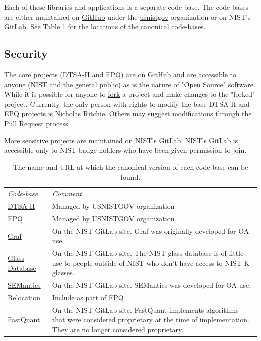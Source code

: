 \documentclass{article}
\begin{document}
Each of these libraries and applications is a separate code-base.  The code bases are either maintained on \href{https://github.com/}{GitHub} under the \href{https://github.com/usnistgov}{usnistgov} organization or on NIST's \href{https://gitlab.nist.gov}{GitLab}.  See Table \ref{tab:code_urls} for the locations of the canonical code-bases.

\subsection{Security}
The core projects (DTSA-II and EPQ) are on GitHub and are accessible to anyone (NIST and the general public) as is the nature of "Open Source" software.  While it is possible for anyone to \href{https://docs.github.com/en/pull-requests/collaborating-with-pull-requests/working-with-forks/fork-a-repo}{fork} a project and make changes to the "forked" project.  Currently, the only person with rights to modify the base DTSA-II and EPQ projects is Nicholas Ritchie.  Others may suggest modifications through the \href{https://github.blog/developer-skills/github-education/beginners-guide-to-github-merging-a-pull-request/}{Pull Request} process.

More sensitive projects are maintained on NIST's GitLab.  NIST's GitLab is accessible only to NIST badge holders who have been given permission to join.

\begin{table}[h!]
    \centering
    \begin{tabular}{p{96pt}p{225pt}}
        \emph{Code-base} & \emph{Comment} \\
        \href{https://github.com/usnistgov/DTSA-II}{DTSA-II} & Managed by USNISTGOV organization \\
        \href{https://github.com/usnistgov/EPQ}{EPQ} & Managed by USNISTGOV organization \\
        \href{https://gitlab.nist.gov/gitlab/nritchie/graf}{Graf} & On the NIST GitLab site.  Graf was originally developed for OA use. \\
        \href{https://gitlab.nist.gov/gitlab/nritchie/nist-glass-database}{Glass Database} & On the NIST GitLab site.  The NIST glass database is of little use to people outside of NIST who don't have access to NIST K-glasses. \\
        \href{https://gitlab.nist.gov/gitlab/nritchie/semantics}{SEMantics} & On the NIST GitLab site.  SEMantics was developed for OA use. \\
        \href{https://github.com/usnistgov/EPQ}{Relocation} & Include as part of \href{https://github.com/usnistgov/EPQ}{EPQ} \\
        \href{https://gitlab.nist.gov/gitlab/nritchie/fastquant}{FastQuant} & On the NIST GitLab site.  FastQuant implements algorithms that were considered proprietary at the time of implementation. They are no longer considered proprietary. \\
    \end{tabular}
    \caption{The name and URL at which the canonical version of each code-base can be found.}
    \label{tab:code_urls}
\end{table}
\end{document}
